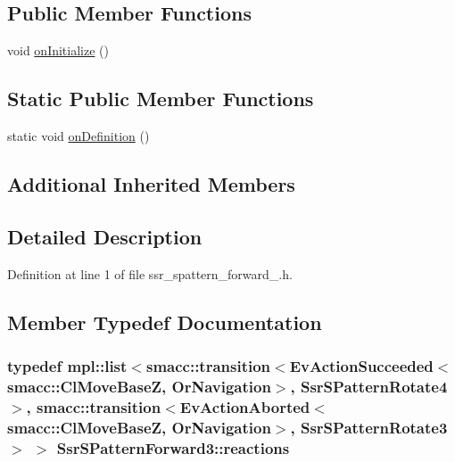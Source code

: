 \subsection*{Public Member Functions}
\begin{DoxyCompactItemize}
\item 
void \hyperlink{structSsrSPatternForward3_a9548fa20d98d23f9b90a1cdaf3c904f9}{on\+Initialize} ()
\end{DoxyCompactItemize}
\subsection*{Static Public Member Functions}
\begin{DoxyCompactItemize}
\item 
static void \hyperlink{structSsrSPatternForward3_ac48e2ef7fa1fcbd44890c24f8e34ef6f}{on\+Definition} ()
\end{DoxyCompactItemize}
\subsection*{Additional Inherited Members}


\subsection{Detailed Description}


Definition at line 1 of file ssr\+\_\+spattern\+\_\+forward\+\_.\+h.



\subsection{Member Typedef Documentation}
\subsubsection[{\texorpdfstring{reactions}{reactions}}]{\setlength{\rightskip}{0pt plus 5cm}typedef mpl\+::list$<${\bf smacc\+::transition}$<$Ev\+Action\+Succeeded$<${\bf smacc\+::\+Cl\+Move\+BaseZ}, Or\+Navigation$>$, {\bf Ssr\+S\+Pattern\+Rotate4}$>$, {\bf smacc\+::transition}$<$Ev\+Action\+Aborted$<${\bf smacc\+::\+Cl\+Move\+BaseZ}, Or\+Navigation$>$, {\bf Ssr\+S\+Pattern\+Rotate3}$>$ $>$ {\bf Ssr\+S\+Pattern\+Forward3\+::reactions}}\hypertarget{structSsrSPatternForward3_a37f21050153ee9cdbb6fef930b00a52d}{}\label{structSsrSPatternForward3_a37f21050153ee9cdbb6fef930b00a52d}


